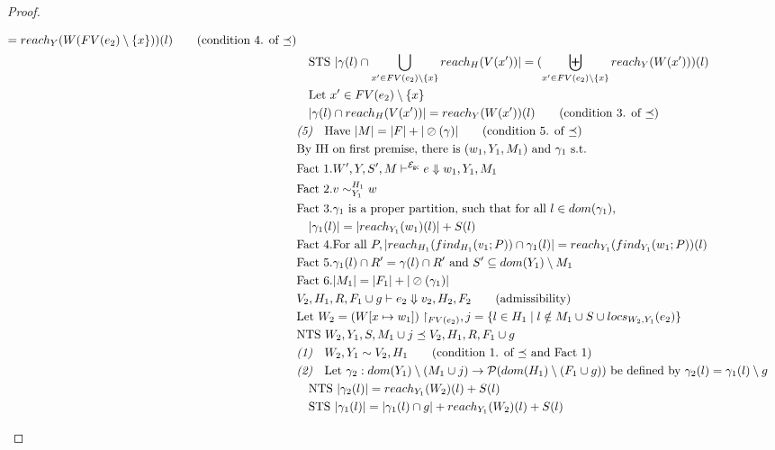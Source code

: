\documentclass[11pt]{article}
\newcommand{\ms}[1]{\ensuremath{\mathsf{#1}}}
\newcommand{\veq}[4]{#3 \sim^{#1}_{#2} #4}
\newcommand{\oh}[1]{\oslash(#1)}
\newcommand{\gcSem}{\ensuremath{\mathcal{E}_{\ms{gc}}}}
\theoremstyle{definition}
\begin{document}
\begin{proof}
\begin{description}
\begin{align*}
			= reach_Y(W(FV(e_2) \setminus \{x\}))(l) \tag{condition 4. of $\preceq$}\\
		&\quad \text{STS } |\gamma(l) \cap \bigcup_{x' \in FV(e_2) \setminus \{x\}} reach_H(V(x'))|
			= (\biguplus_{x' \in FV(e_2) \setminus \{x\}} reach_Y(W(x')))(l)\\
		&\quad \text{Let } x' \in FV(e_2) \setminus \{x\}\\
		&\quad |\gamma(l) \cap reach_H(V(x'))| = reach_Y(W(x'))(l) \tag{condition 3. of $\preceq$}\\
		&\emph{(5)}\quad \text{Have } |M| = |F| + |\oh{\gamma}| \tag{condition 5. of $\preceq$}\\
		&\text{By IH on first premise, there is } (w_1,Y_1,M_1) \text{ and } \gamma_1 \text{ s.t. }\\
		&\text{Fact 1}. W',Y,S',M \vdash^{\gcSem} e \Downarrow w_1,Y_1,M_1\\
		&\text{Fact 2}. \veq{H_1}{Y_1}{v}{w}\\
		&\text{Fact 3}. \gamma_1 \text{ is a proper partition, such that for all } l \in dom(\gamma_1),\\
		&\quad|\gamma_1(l)| = |reach_{Y_1}(w_1)(l)| + S(l)\\
		&\text{Fact 4}. \text{For all } P, |reach_{H_1}(find_{H_1}(v_1;P)) \cap \gamma_1(l)| = 
				reach_{Y_1}(find_{Y_1}(w_1;P))(l)\\
		&\text{Fact 5}. \gamma_1(l) \cap R' = \gamma(l) \cap R' \text{ and } 
			S' \subseteq dom(Y_1) \setminus M_1\\
		&\text{Fact 6}. |M_1| = |F_1| + |\oh{\gamma_1}|\\
		&V_2,H_1,R, F_1 \cup g \vdash e_2 \Downarrow v_2,H_2,F_2 \tag{admissibility}\\
		&\text{Let } W_2 = (W[x \mapsto w_1])\restriction_{FV(e_2)}, 
			j = \{ l \in H_1 \mid l \notin M_1 \cup S \cup locs_{W_2,Y_1}(e_2) \}\\
		&\text{NTS } W_2,Y_1,S,M_1 \cup j \preceq V_2,H_1,R, F_1 \cup g\\
		&\emph{(1)}\quad W_2,Y_1 \sim V_2,H_1 \tag{condition 1. of $\preceq$ and Fact 1}\\
		&\emph{(2)}\quad \text{Let } \gamma_2 : dom(Y_1) \setminus (M_1 \cup j) 
			\to \mathcal{P}(dom(H_1)\setminus (F_1 \cup g)) \text{ be defined by } 
			\gamma_2(l) = \gamma_1(l) \setminus g\\
		&\quad \text{NTS } |\gamma_2(l)| = reach_{Y_1}(W_2)(l) + S(l)\\
		&\quad \text{STS } |\gamma_1(l)| = |\gamma_1(l) \cap g| + reach_{Y_1}(W_2)(l) + S(l)\\

\end{align*}
\end{description}
\end{proof}
\end{document}
